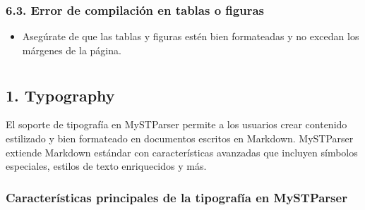 \documentclass[a4paper,10pt,spanish]{sphinxmanual}
\begin{document}
\subsubsection{6.3. Error de compilación en tablas o figuras}
\label{\detokenize{configuracion_inicial/009.Generar_PDF:error-de-compilacion-en-tablas-o-figuras}}\begin{itemize}
\item {} 
\sphinxAtStartPar
Asegúrate de que las tablas y figuras estén bien formateadas y no excedan los márgenes de la página.

\end{itemize}

\sphinxstepscope

\sphinxstepscope


\section{}
\label{\detokenize{configuracion_inicial/013.guia_de_myst_parser:guia-de-uso-myst-parser}}\label{\detokenize{configuracion_inicial/013.guia_de_myst_parser::doc}}

\subsection{1. Typography}
\label{\detokenize{configuracion_inicial/013.guia_de_myst_parser:typography}}
\sphinxAtStartPar
El soporte de tipografía en MyST\sphinxhyphen{}Parser permite a los usuarios crear contenido estilizado y bien formateado en documentos escritos en Markdown. MyST\sphinxhyphen{}Parser extiende Markdown estándar con características avanzadas que incluyen símbolos especiales, estilos de texto enriquecidos y más.


\subsubsection{Características principales de la tipografía en MyST\sphinxhyphen{}Parser}
\label{\detokenize{configuracion_inicial/013.guia_de_myst_parser:caracteristicas-principales-de-la-tipografia-en-myst-parser}}
\end{document}

